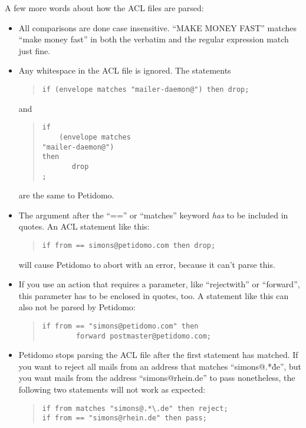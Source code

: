 \documentclass[a4paper,10pt]{scrreprt}
\begin{document}
A few more words about how the ACL files are parsed:
\begin{itemize}

\item All comparisons are done case insensitive. ``MAKE MONEY FAST''
matches ``make money fast'' in both the verbatim and the regular
expression match just fine.

\item Any whitespace in the ACL file is ignored. The statements
\begin{quote}
\begin{verbatim}
if (envelope matches "mailer-daemon@") then drop;
\end{verbatim}
\end{quote}
and
\begin{quote}
\begin{verbatim}
if
    (envelope matches
"mailer-daemon@")
then
       drop
;
\end{verbatim}
\end{quote}
are the same to Petidomo.

\item The argument after the ``=='' or ``matches'' keyword \emph{has}
to be included in quotes. An ACL statement like this:
\begin{quote}
\begin{verbatim}
if from == simons@petidomo.com then drop;
\end{verbatim}
\end{quote}
will cause Petidomo to abort with an error, because it can't parse
this.

\item If you use an action that requires a parameter, like
``rejectwith'' or ``forward'', this parameter has to be enclosed in
quotes, too. A statement like this can also not be parsed by
Petidomo:
\begin{quote}
\begin{verbatim}
if from == "simons@petidomo.com" then
        forward postmaster@petidomo.com;
\end{verbatim}
\end{quote}

\item Petidomo stops parsing the ACL file after the first statement
has matched. If you want to reject all mails from an address that
matches ``simons@.*\.de'', but you want mails from the address
``simons@rhein.de'' to pass nonetheless, the following two statements
will not work as expected:
\begin{quote}
\begin{verbatim}
if from matches "simons@.*\.de" then reject;
if from == "simons@rhein.de" then pass;
\end{verbatim}
\end{quote}


\end{itemize}
\end{document}
